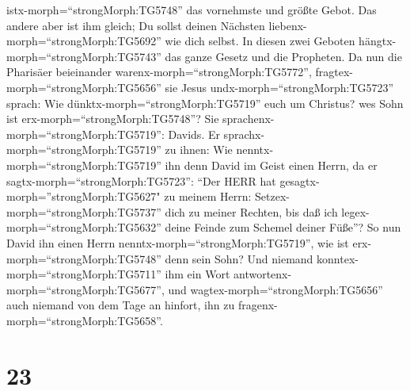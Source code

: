 istx-morph=``strongMorph:TG5748'' das vornehmste und größte Gebot.
 Das andere aber ist ihm gleich; Du sollst deinen Nächsten
liebenx-morph=``strongMorph:TG5692'' wie dich selbst.  In
diesen zwei Geboten hängtx-morph=``strongMorph:TG5743'' das ganze Gesetz
und die Propheten.  Da nun die Pharisäer beieinander
warenx-morph=``strongMorph:TG5772'',
fragtex-morph=``strongMorph:TG5656'' sie Jesus 
undx-morph=``strongMorph:TG5723'' sprach: Wie
dünktx-morph=``strongMorph:TG5719'' euch um Christus? wes Sohn ist
erx-morph=``strongMorph:TG5748''? Sie
sprachenx-morph=``strongMorph:TG5719'': Davids.  Er
sprachx-morph=``strongMorph:TG5719'' zu ihnen: Wie
nenntx-morph=``strongMorph:TG5719'' ihn denn David im Geist einen Herrn,
da er sagtx-morph=``strongMorph:TG5723'':  ``Der HERR hat
gesagtx-morph=''strongMorph:TG5627" zu meinem Herrn:
Setzex-morph=``strongMorph:TG5737'' dich zu meiner Rechten, bis daß ich
legex-morph=``strongMorph:TG5632'' deine Feinde zum Schemel deiner
Füße''?  So nun David ihn einen Herrn
nenntx-morph=``strongMorph:TG5719'', wie ist
erx-morph=``strongMorph:TG5748'' denn sein Sohn?  Und
niemand konntex-morph=``strongMorph:TG5711'' ihm ein Wort
antwortenx-morph=``strongMorph:TG5677'', und
wagtex-morph=``strongMorph:TG5656'' auch niemand von dem Tage an
hinfort, ihn zu fragenx-morph=``strongMorph:TG5658''.

\hypertarget{section-22}{%
\section{23}\label{section-22}}

